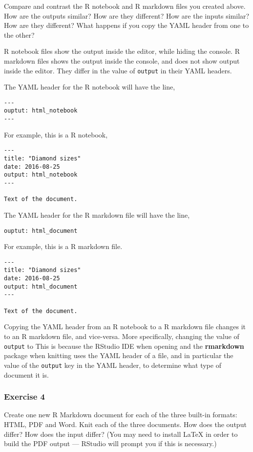 \documentclass[]{book}
\theoremstyle{definition}
\theoremstyle{definition}
\theoremstyle{definition}
\theoremstyle{remark}
\begin{document}
Compare and contrast the R notebook and R markdown files you created
above. How are the outputs similar? How are they different? How are the
inputs similar? How are they different? What happens if you copy the
YAML header from one to the other?

R notebook files show the output inside the editor, while hiding the
console. R markdown files shows the output inside the console, and does
not show output inside the editor. They differ in the value of
\texttt{output} in their YAML headers.

The YAML header for the R notebook will have the line,

\begin{verbatim}
---
ouptut: html_notebook
---
\end{verbatim}

For example, this is a R notebook,

\begin{verbatim}
---
title: "Diamond sizes"
date: 2016-08-25
output: html_notebook
---

Text of the document.
\end{verbatim}

The YAML header for the R markdown file will have the line,

\begin{verbatim}
ouptut: html_document 
\end{verbatim}

For example, this is a R markdown file.

\begin{verbatim}
---
title: "Diamond sizes"
date: 2016-08-25
output: html_document
---

Text of the document.
\end{verbatim}

Copying the YAML header from an R notebook to a R markdown file changes
it to an R markdown file, and vice-versa. More specifically, changing
the value of \texttt{output} to This is because the RStudio IDE when
opening and the \textbf{rmarkdown} package when knitting uses the YAML
header of a file, and in particular the value of the \texttt{output} key
in the YAML header, to determine what type of document it is.

\hypertarget{exercise-4-38}{%
\subsubsection{Exercise 4}\label{exercise-4-38}}

Create one new R Markdown document for each of the three built-in
formats: HTML, PDF and Word. Knit each of the three documents. How does
the output differ? How does the input differ? (You may need to install
LaTeX in order to build the PDF output --- RStudio will prompt you if
this is necessary.)
\end{document}
